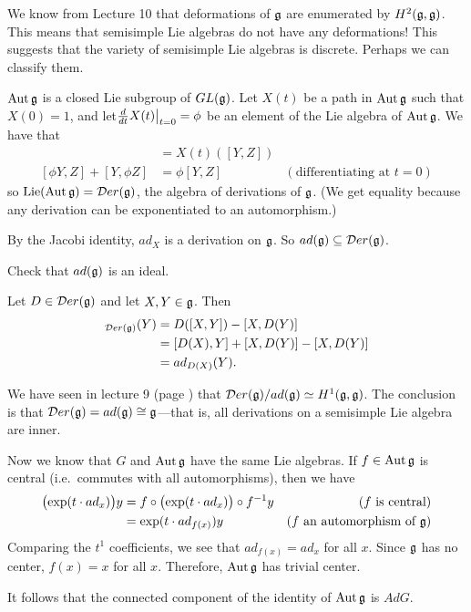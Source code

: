  \begin{remark}
   We know from Lecture 10 that deformations of $\mathfrak{g}$ are enumerated by $H^2(\mathfrak{g},\mathfrak{g})$.
   This means that semisimple Lie algebras do not have any deformations! This suggests
   that the variety of semisimple Lie algebras is discrete. Perhaps we can classify
   them.
 \end{remark}

 $\operatorname{Aut} \mathfrak{g}$ is a closed Lie subgroup of $GL(\mathfrak{g})$. Let $X(t)$ be a path in $\operatorname{Aut} \mathfrak{g}$ such
 that $X(0)=1$, and let$\frac{d }{d t} X(t){\big |}_{t=0} = \phi$ be an element of the Lie
 algebra of $\operatorname{Aut} \mathfrak{g}$. We have that
 \begin{align*}
    [X(t)Y,X(t)Z] &= X(t)([Y,Z])\\
    [\phi Y,Z]+[Y,\phi Z] &= \phi [Y,Z] & (\text{differentiating at }t=0)
 \end{align*}
 so $\operatorname{Lie}(\operatorname{Aut} \mathfrak{g}) = \mathcal{D} er(\mathfrak{g})$, the algebra of derivations of $\mathfrak{g}$. (We get equality
 because any derivation can be exponentiated to an automorphism.)

 By the Jacobi identity, $ad_X$ is a derivation on $\mathfrak{g}$. So $ad(\mathfrak{g})\subseteq \mathcal{D} er(\mathfrak{g})$.
 \begin{exercise}
   Check that $ad(\mathfrak{g})$ is an ideal.
   \begin{solution}
     Let $D\in \mathcal{D} er(\mathfrak{g})$ and let $X,Y\in \mathfrak{g}$. Then
     \begin{align*}
       [D,ad_X]_{\D er(\g)}(Y) &= D([X,Y])-[X,D(Y)]\\
            &= [D(X),Y]+[X,D(Y)]-[X,D(Y)]\\
            &= ad_{D(X)}(Y).
     \end{align*}
   \end{solution}
 \end{exercise}

 We have seen in lecture 9 (page \pageref{lec09H1(g,g)}) that $\mathcal{D} er(\mathfrak{g})/ad(\mathfrak{g}) \simeq
 H^1(\mathfrak{g},\mathfrak{g})$. The conclusion is that $\mathcal{D} er(\mathfrak{g}) = ad(\mathfrak{g})\cong \mathfrak{g}$---that is, all
 derivations on a semisimple Lie algebra are inner.

 Now we know that $G$ and $\operatorname{Aut} \mathfrak{g}$ have the same Lie algebras. If $f\in \operatorname{Aut} \mathfrak{g}$ is
 central (i.e.\ commutes with all automorphisms), then we have
 \begin{align*}
   \bigl(\exp(t\cdot ad_x)\bigr) y &= f\circ \bigl(\exp (t\cdot ad_x)\bigr)\circ
   f^{-1}y & (f \text{ is central})\\
   &= \exp(t\cdot ad_{f(x)}) y & (f \text{ an automorphism of }\mathfrak{g})
 \end{align*}
 Comparing the $t^1$ coefficients, we see that $ad_{f(x)}=ad_x$ for all $x$. Since $\mathfrak{g}$
 has no center, $f(x)=x$ for all $x$. Therefore, $\operatorname{Aut} \mathfrak{g}$ has trivial center.

 It follows that the connected component of the identity of $\operatorname{Aut} \mathfrak{g}$ is $Ad G$.

